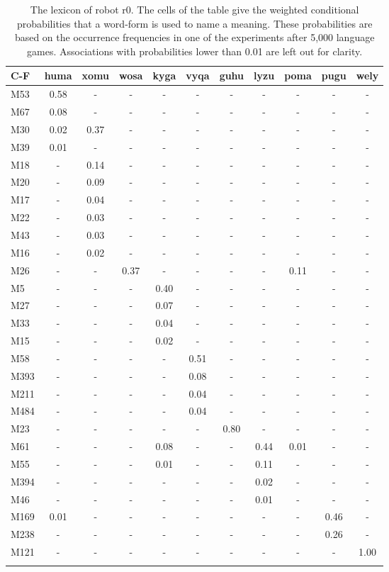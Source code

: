 \begin{table}[t]
\centering
{\footnotesize\begin{tabular}{lcccccccccc}
\lsptoprule
C-F & huma & xomu & wosa & kyga & vyqa & guhu & lyzu & poma & pugu & wely\\\midrule
M53 & 0.58 & - & - & - & - & - & - & - & - & -\\\hline
M67 & 0.08 & - & - & - & - & - & - & - & - & -\\\hline
M30 & 0.02 & 0.37 & - & - & - & - & - & - & - & -\\\hline
M39 & 0.01 & - & - & - & - & - & - & - & - & -\\\hline
M18 & - & 0.14 & - & - & - & - & - & - & - & -\\\hline
M20 & - & 0.09 & - & - & - & - & - & - & - & -\\\hline
M17 & - & 0.04 & - & - & - & - & - & - & - & -\\\hline
M22 & - & 0.03 & - & - & - & - & - & - & - & -\\\hline
M43 & - & 0.03 & - & - & - & - & - & - & - & -\\\hline
M16 & - & 0.02 & - & - & - & - & - & - & - & -\\\hline
M26 & - & - & 0.37 & - & - & - & - & 0.11 & - & -\\\hline
M5 & - & - & - & 0.40 & - & - & - & - & - & -\\\hline
M27 & - & - & - & 0.07 & - & - & - & - & - & -\\\hline
M33 & - & - & - & 0.04 & - & - & - & - & - & -\\\hline
M15 & - & - & - & 0.02 & - & - & - & - & - & -\\\hline
M58 & - & - & - & - & 0.51 & - & - & - & - & -\\\hline
M393 & - & - & - & - & 0.08 & - & - & - & - & -\\\hline
M211 & - & - & - & - & 0.04 & - & - & - & - & -\\\hline
M484 & - & - & - & - & 0.04 & - & - & - & - & -\\\hline
M23 & - & - & - & - & - & 0.80 & - & - & - & -\\\hline
M61 & - & - & - & 0.08 & - & - & 0.44 & 0.01 & - & -\\\hline
M55 & - & - & - & 0.01 & - & - & 0.11 & - & - & -\\\hline
M394 & - & - & - & - & - & - & 0.02 & - & - & -\\\hline
M46 & - & - & - & - & - & - & 0.01 & - & - & -\\\hline
M169 & 0.01 & - & - & - & - & - & - & - & 0.46 & -\\\hline
M238 & - & - & - & - & - & - & - & - & 0.26 & -\\\hline
M121 & - & - & - & - & - & - & - & - & - & 1.00\\
\lspbottomrule
\end{tabular}}
\caption{The lexicon of robot r0. The cells of the table give the weighted conditional probabilities that a word-form is used to name a meaning. These probabilities are based on the occurrence frequencies in one of the experiments after 5,000 language games. Associations with probabilities lower than 0.01 are left out for clarity.}
\label{t:st:lexicon0}
\end{table}

